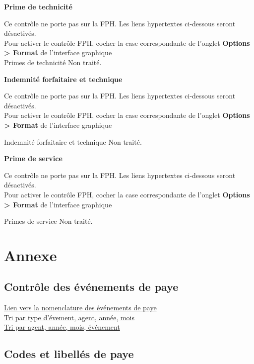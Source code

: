 \textbf{Prime de technicité}

Ce contrôle ne porte pas sur la FPH. Les liens hypertextes ci-dessous
seront désactivés.\\
Pour activer le contrôle FPH, cocher la case correspondante de l'onglet
\textbf{Options \textgreater{} Format} de l'interface graphique\\
Primes de technicité Non traité.

\textbf{Indemnité forfaitaire et technique}

Ce contrôle ne porte pas sur la FPH. Les liens hypertextes ci-dessous
seront désactivés.\\
Pour activer le contrôle FPH, cocher la case correspondante de l'onglet
\textbf{Options \textgreater{} Format} de l'interface graphique

Indemnité forfaitaire et technique Non traité.

\textbf{Prime de service}

Ce contrôle ne porte pas sur la FPH. Les liens hypertextes ci-dessous
seront désactivés.\\
Pour activer le contrôle FPH, cocher la case correspondante de l'onglet
\textbf{Options \textgreater{} Format} de l'interface graphique

Primes de service Non traité.

\newpage

\hypertarget{annexe}{%
\section{Annexe}\label{annexe}}

\hypertarget{controle-des-evenements-de-paye}{%
\subsection{Contrôle des événements de
paye}\label{controle-des-evenements-de-paye}}

\href{../Bases/Fiabilite/Evenements.csv}{Lien vers la nomenclature des
événements de paye}\\
\href{../Bases/Fiabilite/Evenements.ind.csv}{Tri par type d'évement, agent,
année, mois}\\
\href{../Bases/Fiabilite/Evenements.mat.csv}{Tri par agent, année, mois,
événement}

\hypertarget{codes-et-libelles-de-paye}{%
\subsection{Codes et libellés de paye}\label{codes-et-libelles-de-paye}}

